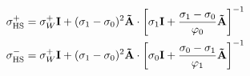 \begin{equation}
\begin{split}
\sigma_{\rm HS}^{+} &= \sigma_W^{+} \mathbf{I} + (\sigma_1 - \sigma_0)^2 \mathbf{\tilde{A}} \cdot
\left[\sigma_1\mathbf{I} + \frac{\sigma_1 - \sigma_0}{\varphi_0}\mathbf{\tilde{A}}\right]^{-1}\\
\sigma_{\rm HS}^{-} &= \sigma_W^{+} \mathbf{I} + (\sigma_1 - \sigma_0)^2 \mathbf{\tilde{A}} \cdot
\left[\sigma_0\mathbf{I} + \frac{\sigma_0 - \sigma_1}{\varphi_1}\mathbf{\tilde{A}}\right]^{-1}
\end{split}
\label{eq:hashin_shtrikman_bounds_anisotropic}
\end{equation}

